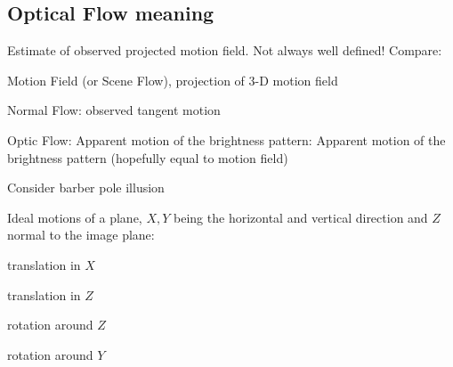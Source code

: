 \begin{compactdesc}
		\section{Optical Flow meaning}
		Estimate of observed projected motion field. Not always well defined! Compare:
		\begin{enumerate*}[label=\protect\circled{\arabic*}]
			\item Motion Field (or Scene Flow), projection of 3-D motion field
			\item Normal Flow: observed tangent motion
			\item Optic Flow: Apparent motion of the brightness pattern: Apparent motion of the brightness pattern (hopefully equal to motion field)
			\item Consider barber pole illusion
		\end{enumerate*}
	\item[\lp{Planar motion}]
		Ideal motions of a plane, $X,Y$ being the horizontal and vertical direction and $Z$ normal to the image plane:
		\begin{enumerate*}[label=\protect\circled{\arabic*}]
			\item translation in $X$
			\item translation in $Z$
			\item rotation around $Z$
			\item rotation around $Y$
		\end{enumerate*}

\end{compactdesc}
